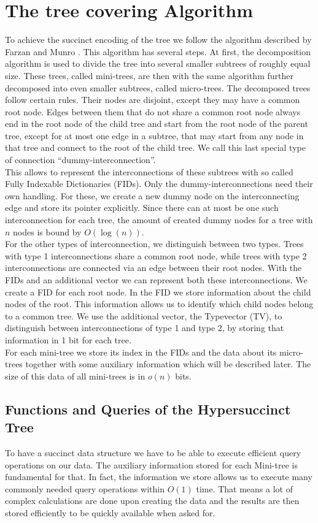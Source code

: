 \documentclass{article}
\begin{document}
\section{The tree covering Algorithm}
To achieve the succinct encoding of the tree we follow the algorithm described by Farzan and Munro \cite{farzanMunro}. This algorithm has several steps. At first, the decomposition algorithm is used to divide the tree into several smaller subtrees of roughly equal size. These trees, called mini-trees, are then with the same algorithm further decomposed into even smaller subtrees, called micro-trees. The decomposed trees follow certain rules. Their nodes are disjoint, except they may have a common root node. Edges between them that do not share a common root node always end in the root node of the child tree and start from the root node of the parent tree, except for at most one edge in a subtree, that may start from any node in that tree and connect to the root of the child tree. We call this last special type of connection “dummy-interconnection”.\\
This allows to represent the interconnections of these subtrees with so called Fully Indexable Dictionaries (FIDs). Only the dummy-interconnections need their own handling. For these, we create a new dummy node on the interconnecting edge and store its pointer explicitly. Since there can at most be one such interconnection for each tree, the amount of created dummy nodes for a tree with $n$ nodes is bound by $O(\log (n))$.\\
For the other types of interconnection, we distinguish between two types. Trees with type 1 interconnections share a common root node, while trees with type 2 interconnections are connected via an edge between their root nodes. With the FIDs and an additional vector we can represent both these interconnections. We create a FID for each root node. In the FID we store information about the child nodes of the root. This information allows us to identify which child nodes belong to a common tree. We use the additional vector, the Typevector (TV), to distinguish between interconnections of type 1 and type 2, by storing that information in 1 bit for each tree.\\
For each mini-tree we store its index in the FIDs and the data about its micro-trees together with some auxiliary information which will be described later. The size of this data of all mini-trees is in $o(n)$ bits.

\subsection{Functions and Queries of the Hypersuccinct Tree}
To have a succinct data structure we have to be able to execute efficient query operations on our data. The auxiliary information stored for each Mini-tree is fundamental for that. In fact, the information we store allows us to execute many commonly needed query operations within $O(1)$ time. That means a lot of complex calculations are done upon creating the data and the results are then stored efficiently to be quickly available when asked for. \\
\end{document}
